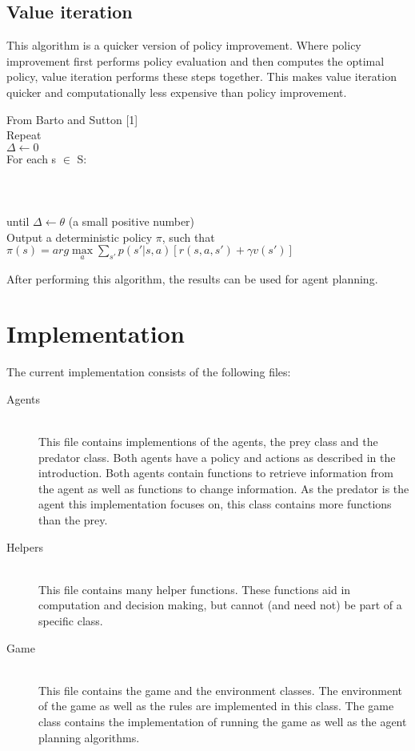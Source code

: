 \documentclass{article}
\newcommand{\tab}[1]{\hspace{10 mm}\rlap{#1}}
\begin{document}
\subsection*{Value iteration}
This algorithm is a quicker version of policy improvement. Where policy improvement first performs policy evaluation and then computes the optimal policy, value iteration performs these steps together. This makes value iteration quicker and computationally less expensive than policy improvement.

\begin{algorithm}[H]
From Barto and Sutton [1]\\
Repeat \\
$\Delta \leftarrow 0$ \\
For each s $\in$ S: \\
\tab{$temp \leftarrow v(s)$} \\
\tab{$v(s) \leftarrow \max\limits_a \sum_{s'} p(s'|s, a)[r(s, a, s') + \gamma v(s')]$} \\
\tab{$\Delta \leftarrow max(temp, |v(s)|)$} \\
until $\Delta \leftarrow \theta$ (a small positive number)\\

Output a deterministic policy $\pi$, such that \\
$\pi (s) = arg \max\limits_a \sum_{s'} p(s'|s, a)[r(s, a, s') + \gamma v(s')]$
\end{algorithm}

After performing this algorithm, the results can be used for agent planning.

\pagebreak

\section*{Implementation}
The current implementation consists of the following files:
\begin{description}
	\item[Agents] \hfill \\ 
	This file contains implementions of the agents, the prey class and the predator class. Both agents have a policy and actions as described in the introduction. Both agents contain functions to retrieve information from the agent as well as functions to change information. As the predator is the agent this implementation focuses on, this class contains more functions than the prey.
	
	\item[Helpers] \hfill \\ 
	This file contains many helper functions. These functions aid in computation and decision making, but cannot (and need not) be part of a specific class.
	
	\item[Game] \hfill \\ 
	This file contains the game and the environment classes. The environment of the game as well as the rules are implemented in this class. The game class contains the implementation of running the game as well as the agent planning algorithms.
\end{description}
\end{document}
